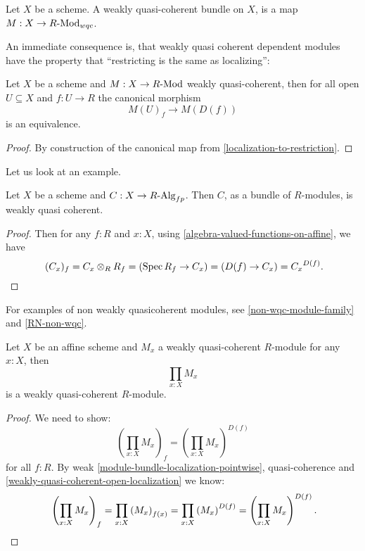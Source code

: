 \begin{definition}%
  \label{weakly-quasi-coherent-bundle}
  Let $X$ be a scheme.
  A weakly quasi-coherent bundle on $X$, is a map $M:X\to R\text{-}\mathrm{Mod}_{wqc}$.
\end{definition}

An immediate consequence is, that
weakly quasi coherent dependent modules have
the property that ``restricting is the same as localizing'':

\begin{lemma}
  \label{weakly-quasi-coherent-open-localization}
  Let $X$ be a scheme and $M:X\to R\text{-}\mathrm{Mod}$ weakly quasi-coherent,
  then for all open $U\subseteq X$ and $f:U\to R$
  the canonical morphism
  \[
    M(U)_f\to M(D(f))
  \]
  is an equivalence.
\end{lemma}

\begin{proof}
  By construction of the canonical map from \cref{localization-to-restriction}.
\end{proof}

Let us look at an example.

\begin{proposition}%
  \label{fp-algebra-bundle-is-quasi-coherent}
  Let $X$ be a scheme and $C:X\to R\text{-}\mathrm{Alg}_{fp}$.
  Then $C$, as a bundle of $R$-modules, is weakly quasi coherent.
\end{proposition}

\begin{proof}
  Then for any $f:R$ and $x:X$, using \cref{algebra-valued-functions-on-affine}, we have
  \[
    (C_x)_f=C_x\otimes_R R_f=(\Spec R_f \to C_x)=(D(f)\to C_x)={C_x}^{D(f)}
    \rlap{.}
  \]
\end{proof}

For examples of non weakly quasicoherent modules,
see \cref{non-wqc-module-family}
and \cref{RN-non-wqc}.

\begin{lemma}%
  \label{weakly-quasi-coherent-pi}
  Let $X$ be an affine scheme and $M_x$ a weakly quasi-coherent $R$-module for any $x:X$,
  then
  \[
    \prod_{x:X}M_x
  \]
  is a weakly quasi-coherent $R$-module.
\end{lemma}

\begin{proof}
  We need to show:
  \[
    \left(\prod_{x:X}M_x\right)_f=\left(\prod_{x:X}M_x\right)^{D(f)}
  \]
  for all $f:R$.
  By weak \cref{module-bundle-localization-pointwise}, quasi-coherence
  and \cref{weakly-quasi-coherent-open-localization}
  we know:
  \[
    \left(\prod_{x:X}M_x\right)_f
    =\prod_{x:X}\left(M_x\right)_{f(x)}
    =\prod_{x:X}\left(M_x\right)^{D(f)}
    =\left(\prod_{x:X}M_x\right)^{D(f)}
    \rlap{.}
  \]
\end{proof}

